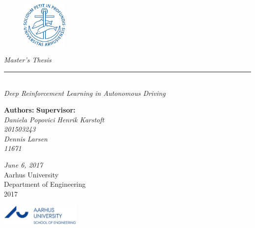 \thispagestyle{empty}

\begin{figure}[H]
	\raggedleft
	\includegraphics[width=0.2\textwidth]{Figures/Aarhus_University_logo.png}
\end{figure}

\begin{center}
	\textsl{\LARGE Master's Thesis } \\ \vspace{0cm}
	\rule{15cm}{0.5mm}  \\ \vspace{0.5cm}
	\textsl{\HUGE Deep Reinforcement Learning in Autonomous Driving}
	
	
	\vfill
	\begin{flushleft}
		\textbf{Authors:} \hfill                 \textbf{Supervisor:}   \\
		\textit{Daniela Popovici} \hfill        \textit{Henrik Karstoft}        \\
		\textsl{201503243}\\
		\textit{Dennis Larsen}\\
		\textsl{11671}
	\end{flushleft}
	\vfill
	\textit{June 6, 2017}\\
	Aarhus University \\
	Department of Engineering \\
	2017
\end{center}

\newpage

{}


\begin{minipage}[t]{0.48\textwidth}
	\vspace*{14pt}			%
	\vspace{1.2cm}
	\includegraphics[height=1cm]{Figures/au_ingenioerhoejskolen_en_logo.jpg} 
\end{minipage}
\hfill

\vspace*{1cm}

